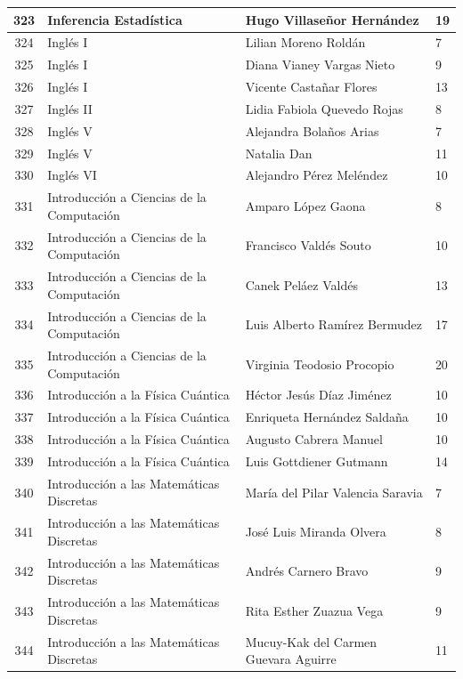 {\begin{longtable}{|c|p{6.5cm}|p{5cm}|p{1.5cm}|}
  323 & Inferencia Estadística & Hugo Villaseñor Hernández & 19 \\ \hline 
  324 & Inglés I & Lilian Moreno Roldán & 7 \\ \hline 
  325 & Inglés I & Diana Vianey Vargas Nieto & 9 \\ \hline 
  326 & Inglés I & Vicente Castañar Flores & 13 \\ \hline 
  327 & Inglés II & Lidia Fabiola Quevedo Rojas & 8 \\ \hline 
  328 & Inglés V & Alejandra Bolaños Arias & 7 \\ \hline 
  329 & Inglés V & Natalia Dan & 11 \\ \hline 
  330 & Inglés VI & Alejandro Pérez Meléndez & 10 \\ \hline 
  331 & Introducción a Ciencias de la Computación & Amparo López Gaona & 8 \\ \hline 
  332 & Introducción a Ciencias de la Computación & Francisco Valdés Souto & 10 \\ \hline 
  333 & Introducción a Ciencias de la Computación & Canek Peláez Valdés & 13 \\ \hline 
  334 & Introducción a Ciencias de la Computación & Luis Alberto Ramírez Bermudez & 17 \\ \hline 
  335 & Introducción a Ciencias de la Computación & Virginia Teodosio Procopio & 20 \\ \hline 
  336 & Introducción a la Física Cuántica & Héctor Jesús Díaz Jiménez & 10 \\ \hline 
  337 & Introducción a la Física Cuántica & Enriqueta Hernández Saldaña & 10 \\ \hline 
  338 & Introducción a la Física Cuántica & Augusto Cabrera Manuel & 10 \\ \hline 
  339 & Introducción a la Física Cuántica & Luis Gottdiener Gutmann & 14 \\ \hline 
  340 & Introducción a las Matemáticas Discretas & María del Pilar Valencia Saravia & 7 \\ \hline 
  341 & Introducción a las Matemáticas Discretas & José Luis Miranda Olvera & 8 \\ \hline 
  342 & Introducción a las Matemáticas Discretas & Andrés Carnero Bravo & 9 \\ \hline 
  343 & Introducción a las Matemáticas Discretas & Rita Esther Zuazua Vega & 9 \\ \hline 
  344 & Introducción a las Matemáticas Discretas & Mucuy-Kak del Carmen Guevara Aguirre & 11 \\ \hline 

\end{longtable}}
